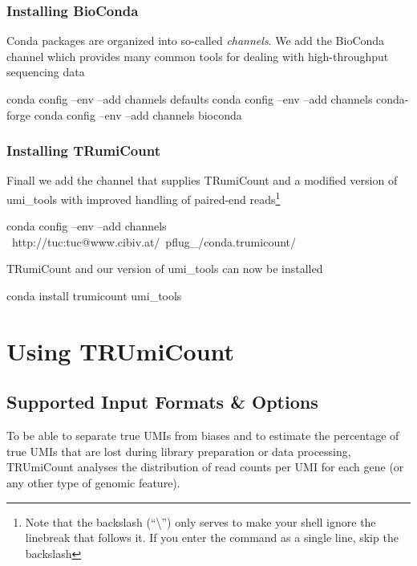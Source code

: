 \documentclass[10pt]{article}
\begin{document}
\subsubsection*{Installing BioConda}

Conda packages are organized into so-called \emph{channels}. We add the BioConda channel which provides many common tools for dealing with high-throughput sequencing data

\begin{shellcode}
conda config --env --add channels defaults
conda config --env --add channels conda-forge
conda config --env --add channels bioconda
\end{shellcode}

\subsubsection*{Installing TRumiCount}

Finall we add the channel that supplies TRumiCount and a modified version of umi\_tools with improved handling of paired-end reads\footnote{Note that the backslash (``\textbackslash'') only serves to make your shell ignore the linebreak that follows it. If you enter the command as a single line, skip the backslash}

\begin{shellcode}
conda config --env --add channels \
  http://tuc:tuc@www.cibiv.at/~pflug_/conda.trumicount/
\end{shellcode}

TRumiCount and our version of umi\_tools can now be installed

\begin{shellcode}
conda install trumicount umi_tools
\end{shellcode}

\section{Using TRUmiCount}

\subsection{Supported Input Formats \& Options}

To be able to separate true UMIs from biases and to estimate the percentage of true UMIs that are lost during library preparation or data processing, TRUmiCount analyses the distribution of read counts per UMI for each gene (or any other type of genomic feature).
\end{document}
